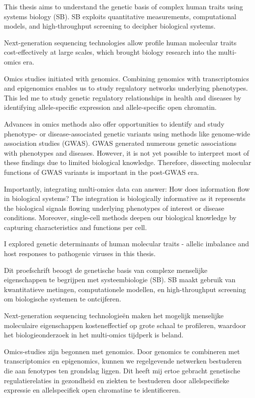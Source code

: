 \documentclass{book}
\begin{document}
This thesis aims to understand the genetic basis of complex human traits using systems biology (SB).
SB exploits quantitative measurements, computational models, and high-throughput screening to decipher biological systems.

Next-generation sequencing technologies allow profile human molecular traits cost-effectively at large scales, which brought biology research into the multi-omics era.

Omics studies initiated with genomics.
Combining genomics with transcriptomics and epigenomics enables us to study regulatory networks underlying phenotypes.
This led me to study genetic regulatory relationships in health and diseases by identifying allele-specific expression and allele-specific open chromatin.

Advances in omics methods also offer opportunities to identify and study phenotype- or disease-associated genetic variants using methods like genome-wide association studies (GWAS).
GWAS generated numerous genetic associations with phenotypes and diseases.
However, it is not yet possible to interpret most of these findings due to limited biological knowledge.
Therefore, dissecting molecular functions of GWAS variants is important in the post-GWAS era.

Importantly, integrating multi-omics data can answer: How does information flow in biological systems?
The integration is biologically informative as it represents the biological signals flowing underlying phenotypes of interest or disease conditions.
Moreover, single-cell methods deepen our biological knowledge by capturing characteristics and functions per cell.

I explored genetic determinants of human molecular traits - allelic imbalance and host responses to pathogenic viruses in this thesis.

Dit proefschrift beoogt de genetische basis van complexe menselijke eigenschappen te begrijpen met systeembiologie (SB).
SB maakt gebruik van kwantitatieve metingen, computationele modellen, en high-throughput screening om biologische systemen te ontcijferen.

Next-generation sequencing technologieën maken het mogelijk menselijke moleculaire eigenschappen kosteneffectief op grote schaal te profileren, waardoor het biologieonderzoek in het multi-omics tijdperk is beland.

Omics-studies zijn begonnen met genomics.
Door genomics te combineren met transcriptomics en epigenomics, kunnen we regelgevende netwerken bestuderen die aan fenotypes ten grondslag liggen.
Dit heeft mij ertoe gebracht genetische regulatierelaties in gezondheid en ziekten te bestuderen door allelspecifieke expressie en allelspecifiek open chromatine te identificeren.
\end{document}
